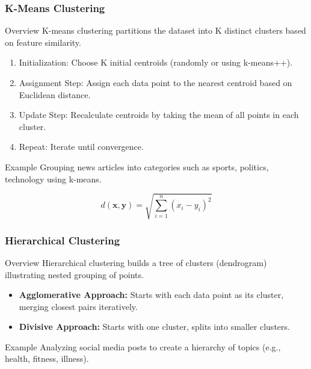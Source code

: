 \documentclass[aspectratio=169]{beamer}
\begin{document}
\begin{frame}[fragile]
    \frametitle{K-Means Clustering}
    \begin{block}{Overview}
        K-means clustering partitions the dataset into K distinct clusters based on feature similarity.
    \end{block}
    
    \begin{enumerate}
        \item Initialization: Choose K initial centroids (randomly or using k-means++).
        \item Assignment Step: Assign each data point to the nearest centroid based on Euclidean distance.
        \item Update Step: Recalculate centroids by taking the mean of all points in each cluster.
        \item Repeat: Iterate until convergence.
    \end{enumerate}
    
    \begin{block}{Example}
        Grouping news articles into categories such as sports, politics, technology using k-means.
    \end{block}
    
    \begin{equation}
    d(\mathbf{x}, \mathbf{y}) = \sqrt{\sum_{i=1}^{n} (x_i - y_i)^2}
    \end{equation}
\end{frame}

\begin{frame}[fragile]
    \frametitle{Hierarchical Clustering}
    \begin{block}{Overview}
        Hierarchical clustering builds a tree of clusters (dendrogram) illustrating nested grouping of points.
    \end{block}
    
    \begin{itemize}
        \item \textbf{Agglomerative Approach:} Starts with each data point as its cluster, merging closest pairs iteratively.
        \item \textbf{Divisive Approach:} Starts with one cluster, splits into smaller clusters.
    \end{itemize}

    \begin{block}{Example}
        Analyzing social media posts to create a hierarchy of topics (e.g., health, fitness, illness).
    \end{block}
\end{frame}
\end{document}
